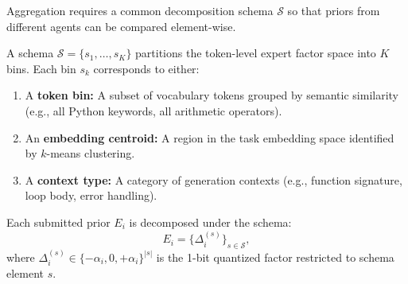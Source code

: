 Aggregation requires a common decomposition schema $\mathcal{S}$ so that priors
from different agents can be compared element-wise.

\begin{definition}[Schema]
A schema $\mathcal{S} = \{s_1, \ldots, s_K\}$ partitions the token-level
expert factor space into $K$ bins. Each bin $s_k$ corresponds to either:
\begin{enumerate}[leftmargin=1.5em]
    \item A \textbf{token bin:} A subset of vocabulary tokens grouped by
          semantic similarity (e.g., all Python keywords, all arithmetic
          operators).
    \item An \textbf{embedding centroid:} A region in the task embedding space
          identified by $k$-means clustering.
    \item A \textbf{context type:} A category of generation contexts (e.g.,
          function signature, loop body, error handling).
\end{enumerate}
\end{definition}

Each submitted prior $E_i$ is decomposed under the schema:
\begin{equation}
    E_i = \{\Delta_i^{(s)}\}_{s \in \mathcal{S}},
\end{equation}
where $\Delta_i^{(s)} \in \{-\alpha_i, 0, +\alpha_i\}^{|s|}$ is the 1-bit
quantized factor restricted to schema element $s$.

